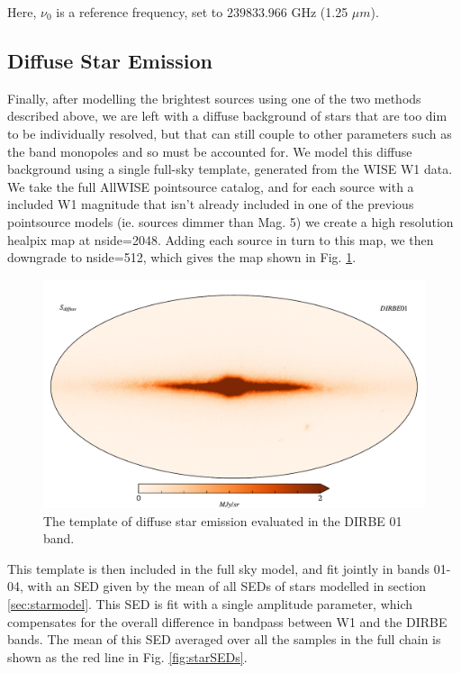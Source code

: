 \documentclass{aa}
\begin{document}
Here, $\nu_0$ is a reference frequency, set to $239833.966$ GHz (1.25 $\mu m$). 



\subsection{Diffuse Star Emission}

\label{sec:diffusemodel}

Finally, after modelling the brightest sources using one of the two methods described above, we are left with a diffuse background of stars that are too dim to be individually resolved, but that can still couple to other parameters such as the band monopoles and so must be accounted for. We model this diffuse background using a single full-sky template, generated from the WISE W1 data. We take the full AllWISE pointsource catalog, and for each source with a included W1 magnitude that isn't already included in one of the previous pointsource models (ie. sources dimmer than Mag. 5) we create a high resolution healpix map \citep{healpix} at nside=2048. Adding each source in turn to this map, we then downgrade to nside=512, which gives the map shown in Fig. \ref{fig:diffuse}. 

\begin{figure}
  \centering
  \includegraphics[width=\columnwidth]{figs/diffuseTemplate/diffuse_stars.pdf}
  \caption{The template of diffuse star emission evaluated in the DIRBE 01 band.}
  \label{fig:diffuse}
\end{figure}

This template is then included in the full sky model, and fit jointly in bands 01-04, with an SED given by the mean of all SEDs of stars modelled in section \ref{sec:starmodel}. This SED is fit with a single amplitude parameter, which compensates for the overall difference in bandpass between W1 and the DIRBE bands. The mean of this SED averaged over all the samples in the full chain is shown as the red line in Fig. \ref{fig:starSEDs}.
\end{document}

